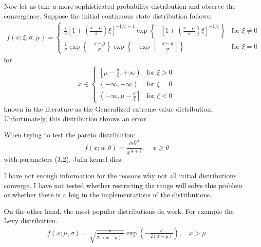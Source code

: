 \documentclass[a4paper,12pt]{article}
\theoremstyle{definition}
\begin{document}
Now let us take a more sophisticated probability distribution and observe the convergence. Suppose the initial continuous state distribution follows:
\begin{equation}
\begin{split}f(x; \xi, \sigma, \mu) = \begin{cases}
        \frac{1}{\sigma} \left[ 1+\left(\frac{x-\mu}{\sigma}\right)\xi\right]^{-1/\xi-1} \exp\left\{-\left[ 1+ \left(\frac{x-\mu}{\sigma}\right)\xi\right]^{-1/\xi} \right\} & \text{for } \xi \neq 0 \\
        \frac{1}{\sigma} \exp\left\{-\frac{x-\mu}{\sigma}\right\} \exp\left\{-\exp\left[-\frac{x-\mu}{\sigma}\right]\right\} & \text{for } \xi = 0
    \end{cases}\end{split}
\end{equation}
for
\begin{equation}
\begin{split}x \in \begin{cases}
        \left[ \mu - \frac{\sigma}{\xi}, + \infty \right) & \text{for } \xi > 0 \\
        \left( - \infty, + \infty \right) & \text{for } \xi = 0 \\
        \left( - \infty, \mu - \frac{\sigma}{\xi} \right] & \text{for } \xi < 0
    \end{cases}\end{split}
\end{equation}
known in the literature as the Generalized extreme value distribution. Unfortunately, this distribution throws an error. 

When trying to test the pareto distribution:
\begin{equation}
f(x; \alpha, \theta) = \frac{\alpha \theta^\alpha}{x^{\alpha + 1}}, \quad x \ge \theta
\end{equation}
with parameters (3,2), Julia kernel dies.

I have not enough information for the reasons why not all initial distributions converge. I have not tested whether restricting the range will solve this problem or whether there is a bug in the implementations of the distributions. 

On the other hand, the most popular distributions do work. For example the Levy distribution.
\begin{equation}
\begin{split}f(x; \mu, \sigma) = \sqrt{\frac{\sigma}{2 \pi (x - \mu)^3}}
\exp \left( - \frac{\sigma}{2 (x - \mu)} \right), \quad x > \mu\end{split}
\end{equation}
\end{document}
